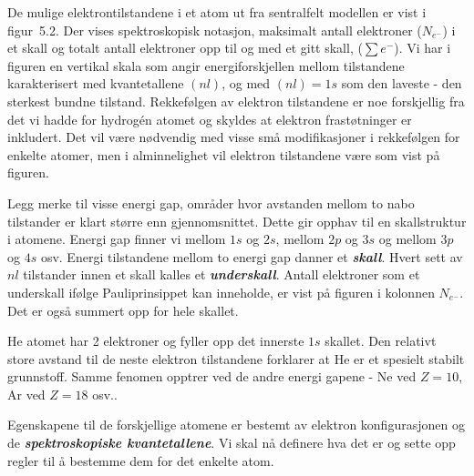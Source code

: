 De mulige elektrontilstandene i et atom ut fra sentralfelt modellen
er vist i figur~5.2. Der vises
spektroskopisk notasjon, maksimalt  antall elektroner
($N_{e^-}$) i et skall og totalt antall elektroner opp til og med 
et gitt skall, ($\sum e^-$).
Vi har i figuren  en vertikal skala som angir energiforskjellen mellom
tilstandene karakterisert med kvantetallene  $(nl) $, og med 
$ (nl) = 1s$ som den laveste -  den sterkest
bundne tilstand.  Rekkef{\o}lgen av elektron tilstandene er noe
forskjellig fra det vi hadde for hydrog\'{e}n atomet
og skyldes at elektron frast{\o}tninger er inkludert.
Det vil v{\ae}re n{\o}dvendig med visse sm{\aa} modifikasjoner
i rekkef{\o}lgen for enkelte atomer, men i alminnelighet vil elektron
tilstandene v{\ae}re som vist p{\aa} figuren.

Legg merke til visse energi gap, omr{\aa}der hvor
avstanden  mellom to nabo tilstander er klart st{\o}rre enn gjennomsnittet.
Dette gir opphav til en skallstruktur
i atomene. Energi gap finner vi mellom $1s$ og $2s$, mellom $2p$
og $3s$ og mellom $3p$ og $4s$ osv. Energi tilstandene  mellom
to energi gap danner et {\sl \bf skall}. Hvert sett av $nl$
tilstander innen et skall kalles et {\bf \sl underskall}.
Antall elektroner som et underskall if{\o}lge
Pauliprinsippet kan inneholde, er vist p{\aa} figuren i kolonnen
$N_{e^-}$. Det er ogs{\aa} summert opp for hele skallet.

He atomet har 2 elektroner og fyller opp det innerste
$1s$ skallet. Den relativt store avstand til de neste
elektron tilstandene forklarer at He  er et spesielt  stabilt
grunnstoff. Samme fenomen opptrer ved de andre energi
gapene - Ne ved $Z = 10$, Ar ved $Z = 18$ osv..

Egenskapene til de forskjellige atomene er bestemt av elektron
konfigurasjonen og de {\bf \sl spektroskopiske kvantetallene}.
Vi skal n{\aa} definere hva det er og sette opp regler til {\aa} bestemme
dem for det enkelte atom.

